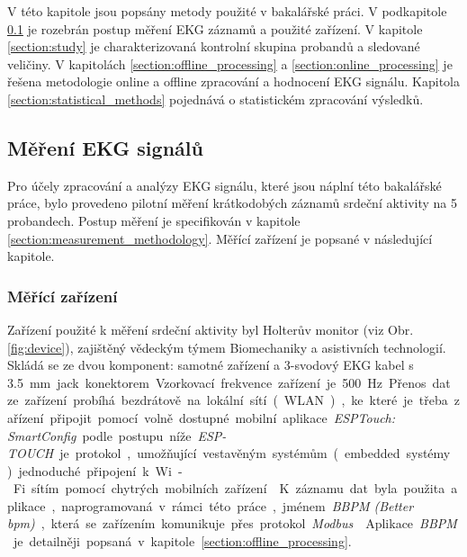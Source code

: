 V této kapitole jsou popsány metody použité v bakalářské práci. V podkapitole
\ref{section:measurement} je rozebrán postup měření EKG záznamů a použité
zařízení. V kapitole \ref{section:study} je charakterizovaná kontrolní skupina
probandů a sledované veličiny. V kapitolách \ref{section:offline_processing} a
\ref{section:online_processing} je řešena metodologie online a offline
zpracování a hodnocení EKG signálu. Kapitola \ref{section:statistical_methods}
pojednává o statistickém zpracování výsledků.

\subsection{Měření EKG signálů}
\label{section:measurement}
Pro účely zpracování a analýzy EKG signálu, které jsou náplní této bakalářské
práce, bylo provedeno pilotní měření krátkodobých záznamů srdeční aktivity na 5
probandech. Postup měření je specifikován v kapitole
\ref{section:measurement_methodology}. Měřící zařízení je popsané v následující
kapitole.

\subsubsection{Měřící zařízení}
\label{section:measurement_device}
Zařízení použité k měření srdeční aktivity byl Holterův monitor (viz Obr.
\ref{fig:device}), zajištěný vědeckým týmem Biomechaniky a asistivních
technologií. Skládá se ze dvou komponent: samotné zařízení a 3-svodový EKG kabel
s 3.5~\si\mm~jack konektorem. Vzorkovací frekvence zařízení je 500 \si\Hz.

Přenos dat ze zařízení probíhá bezdrátově na lokální sítí (WLAN), ke které je
třeba zařízení připojit pomocí volně dostupné mobilní aplikace \textit{ESPTouch:
    SmartConfig} podle postupu níže. \textit{ESP-TOUCH} je protokol, umožňující
vestavěným systémům (embedded systémy) jednoduché připojení k Wi-Fi sítím pomocí
chytrých mobilních zařízení \cite{esptouch}. K záznamu dat byla použita
aplikace, naprogramovaná v rámci této práce, jménem \textit{BBPM (Better bpm)},
která se zařízením komunikuje přes protokol \textit{Modbus} \cite{modbus}.
Aplikace \textit{BBPM} je detailněji popsaná v kapitole
\ref{section:offline_processing}.

